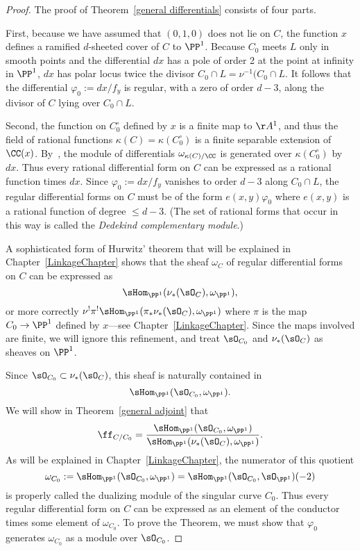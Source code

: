 \begin{proof}
The proof of Theorem~\ref{general differentials} consists of four parts. 

First, because we have assumed that $(0,1,0)$ does not lie on $C$, the function $x$ defines a
ramified $d$-sheeted cover of $C$ to $\PP^{1}$. Because $C_{0}$ meets $L$ only in smooth
points and the differential $dx$ has a pole of order 2 at the point at infinity in $\PP^{1}$,
$dx$
has polar locus twice the divisor $C_{0}\cap L = \nu^{-1}(C_{0}\cap L$. It follows that
the differential
$\varphi_0 := dx/f_{y}$ is regular, with a zero of order $d-3$,
along the divisor of $C$ lying over $C_0\cap L$.

Second, the function on $C^\circ_0$ defined by $x$  
is a finite map to $\AA^1$, and thus the field of rational functions $\kappa(C) = \kappa(C^\circ_0)$ is a finite
separable extension of $\CC(x)$. By~\cite[Section 16.5]{Eisenbud1995}, the module of differentials 
$\omega_{\kappa(C)/\CC}$ is generated over $\kappa(C^\circ_0)$ by $dx$. Thus every rational
differential form on $C$ can be expressed as a rational function
times $dx$. Since $\varphi_{0} := dx/f_{y}$ vanishes to order $d-3$ along $C_{0}\cap L$,
the regular differential forms on $C$ must be of the form $e(x,y)\varphi_{0}$ where
$e(x,y)$ is a rational function of degree $\leq d-3$. (The set of rational forms that occur in this
way is called the \emph{Dedekind complementary module}.)
 
A sophisticated form of Hurwitz' theorem that will be explained in Chapter~\ref{LinkageChapter}
shows that the sheaf $\omega_{C}$ of regular differential forms on $C$ can be expressed as
$$
\sHom_{\PP^{1}}(\nu_{*}(\sO_{C}), \omega_{\PP^{1}}),
$$
or more correctly $\nu^{!}\pi^{!}\sHom_{\PP^{1}}(\pi_{*}\nu_{*}(\sO_{C}), \omega_{\PP^{1}})$
where $\pi$ is the map $C_{0}\to \PP^{1}$ defined by $x$---see Chapter~\ref{LinkageChapter}. Since the maps involved are finite,
we will ignore this refinement, and treat $\sO_{C_{0}}$ and $\nu_{*}(\sO_{C})$ as sheaves on $\PP^{1}$.

Since $\sO_{C_{0}}\subset \nu_{*}(\sO_{C})$, this sheaf is naturally contained
in 
$$
\sHom_{\PP^{1}}(\sO_{C_{0}}, \omega_{\PP^{1}}).
$$
We will show in Theorem~\ref{general adjoint} that 
$$
\ff_{C/C_{0}} = 
\frac{\sHom_{\PP^{1}}(\sO_{C_{0}}, \omega_{\PP^{1}})}
{\sHom_{\PP^{1}}(\nu_{*}(\sO_{C}), \omega_{\PP^{1}})}.
$$
As will be explained in Chapter~\ref{LinkageChapter}, the numerator of this quotient
$$
\omega_{C_{0}}:= \sHom_{\PP^{1}}(\sO_{C_{0}}, \omega_{\PP^{1}}) = 
\sHom_{\PP^{1}}(\sO_{C_{0}}, \sO_{\PP^{1}})(-2)
$$
 is properly called the dualizing module  of the singular curve $C_{0}$.
Thus every regular differential form on $C$ can be expressed as an element of the conductor
times some element of $\omega_{C_{0}}$. To prove the Theorem, we must show that
$\varphi_{0}$ generates $\omega_{C_{0}}$ as a module over $\sO_{C_{0}}$.


\end{proof}
